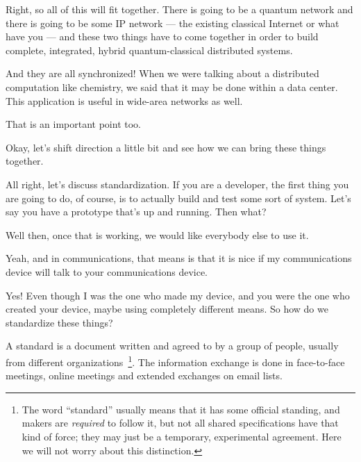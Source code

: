 \rrr Right, so all of this will fit together. There is going to be a quantum network and there is going to be some IP network --- the existing classical Internet or what have you --- and these two things have to come together in order to build complete, integrated, hybrid quantum-classical distributed systems.

\mmm And they are all synchronized!
When we were talking about a distributed computation like chemistry, we said that it may be done within a data center. This application is useful in wide-area networks as well.

\rrr That is an important point too.

\mmm Okay, let's shift direction a little bit and see how we can bring these things together.

\rrr All right, let's discuss standardization. If you are a developer, the first thing you are going to do, of course, is to actually build and test some sort of system. Let's say you have a prototype that's up and running. Then what?

\mmm Well then, once that is working, we would like everybody else to use it.

\rrr Yeah, and in communications, that means is that it is nice if my communications device will talk to your communications device.

\mmm Yes! Even though I was the one who made my device, and you were the one who created your device, maybe using completely different means. So how do we standardize these things?

\rrr A standard is a document written and agreed to by a group of people, usually from different organizations~\footnote{The word ``standard'' usually means that it has some official standing, and makers are \emph{required} to follow it, but not all shared specifications have that kind of force; they may just be a temporary, experimental agreement. Here we will not worry about this distinction.}. The information exchange is done in face-to-face meetings, online meetings and extended exchanges on email lists.

